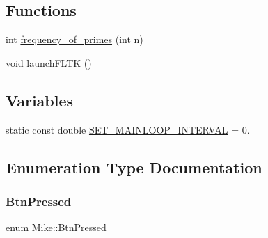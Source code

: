 \subsection*{Functions}
\begin{DoxyCompactItemize}
\item 
int \hyperlink{namespace_mike_ada7afe897748f668730c74456952e356}{frequency\+\_\+of\+\_\+primes} (int n)
\item 
void \hyperlink{namespace_mike_a11de29a6b789ad768bf74759d81c1957}{launch\+F\+L\+TK} ()
\end{DoxyCompactItemize}
\subsection*{Variables}
\begin{DoxyCompactItemize}
\item 
static const double \hyperlink{namespace_mike_abbeda217f93388b7dd036c32d183f426}{S\+E\+T\+\_\+\+M\+A\+I\+N\+L\+O\+O\+P\+\_\+\+I\+N\+T\+E\+R\+V\+AL} = 0.
\end{DoxyCompactItemize}


\subsection{Enumeration Type Documentation}
\mbox{\label{namespace_mike_a9dd611fa3c671b02e477e6b21465cc66}} 
\subsubsection{\texorpdfstring{Btn\+Pressed}{BtnPressed}}
{\footnotesize\ttfamily enum \hyperlink{namespace_mike_a9dd611fa3c671b02e477e6b21465cc66}{Mike\+::\+Btn\+Pressed}\hspace{0.3cm}{\ttfamily [strong]}}

